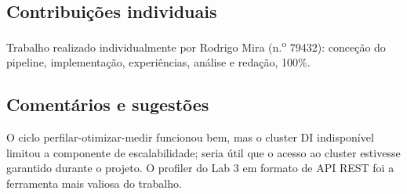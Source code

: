 \documentclass[sigconf]{acmart}
\begin{document}
\subsection*{Contribuições individuais}
Trabalho realizado individualmente por Rodrigo Mira (n.\textsuperscript{o}
79432): conceção do pipeline, implementação, experiências, análise e
redação, 100\%.

\subsection*{Comentários e sugestões}
O ciclo perfilar-otimizar-medir funcionou bem, mas o cluster DI
indisponível limitou a componente de escalabilidade; seria útil que o
acesso ao cluster estivesse garantido durante o projeto. O profiler do
Lab 3 em formato de API REST foi a ferramenta mais valiosa do trabalho.
\end{document}
